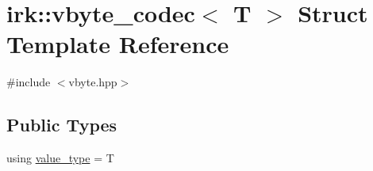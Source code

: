 \hypertarget{structirk_1_1vbyte__codec}{}\section{irk\+:\+:vbyte\+\_\+codec$<$ T $>$ Struct Template Reference}
\label{structirk_1_1vbyte__codec}


{\ttfamily \#include $<$vbyte.\+hpp$>$}

\subsection*{Public Types}
\begin{DoxyCompactItemize}
\item 
using \mbox{\hyperlink{structirk_1_1vbyte__codec_aa59c947ce3a8b15f476295fe4b944f99}{value\+\_\+type}} = T
\end{DoxyCompactItemize}
